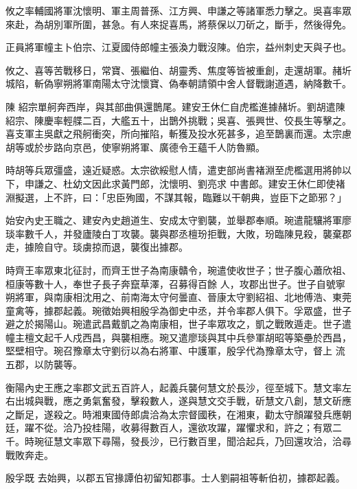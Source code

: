 \begin{pinyinscope}
 攸之率輔國將軍沈懷明、軍主周普孫、江方興、申謙之等諸軍悉力擊之。吳喜率眾來赴，為胡別軍所圍，甚急。有人來捉喜馬，將蔡保以刀斫之，斷手，然後得免。



 正員將軍幢主卜伯宗、江夏國侍郎幢主張渙力戰沒陳。伯宗，益州刺史天與子也。



 攸之、喜等苦戰移日，常寶、張繼伯、胡靈秀、焦度等皆被重創，走還胡軍。赭圻城陷，斬偽寧朔將軍南陽太守沈懷寶、偽奉朝請領中舍人督戰謝道遇，納降數千。



 陳
 紹宗單舸奔西岸，與其部曲俱還鵲尾。建安王休仁自虎檻進據赭圻。劉胡遣陳紹宗、陳慶率輕艓二百，大艦五十，出鵲外挑戰；吳喜、張興世、佼長生等擊之。喜支軍主吳獻之飛舸衝突，所向摧陷，斬獲及投水死甚多，追至鵲裏而還。太宗慮胡等或於步路向京邑，使寧朔將軍、廣德令王蘊千人防魯顯。



 時胡等兵眾彊盛，遠近疑惑。太宗欲綏慰人情，遣吏部尚書褚淵至虎檻選用將帥以下，申謙之、杜幼文因此求黃門郎，沈懷明、劉亮求
 中書郎。建安王休仁即使褚淵擬選，上不許，曰：「忠臣殉國，不謀其報，臨難以干朝典，豈臣下之節邪？」



 始安內史王職之、建安內史趙道生、安成太守劉襲，並舉郡奉順。琬遣龍驤將軍廖琰率數千人，并發廬陵白丁攻襲。襲與郡丞檀玢拒戰，大敗，玢臨陳見殺，襲棄郡走，據險自守。琰虜掠而退，襲復出據郡。



 時齊王率眾東北征討，而齊王世子為南康贛令，琬遣使收世子；世子腹心蕭欣祖、桓康等數十人，奉世子長子奔竄草澤，召募得百餘
 人，攻郡出世子。世子自號寧朔將軍，與南康相沈用之、前南海太守何曇直、晉康太守劉紹祖、北地傅浩、東莞童禽等，據郡起義。琬徵始興相殷孚為御史中丞，并令率郡人俱下。孚眾盛，世子避之於揭陽山。琬遣武昌戴凱之為南康相，世子率眾攻之，凱之戰敗遁走。世子遣幢主檀文起千人戍西昌，與襲相應。琬又遣廖琰與其中兵參軍胡昭等築壘於西昌，堅壁相守。琬召豫章太守劉衍以為右將軍、中護軍，殷孚代為豫章太守，督上
 流五郡，以防襲等。



 衡陽內史王應之率郡文武五百許人，起義兵襲何慧文於長沙，徑至城下。慧文率左右出城與戰，應之勇氣奮發，擊殺數人，遂與慧文交手戰，斫慧文八創，慧文斫應之斷足，遂殺之。時湘東國侍郎虞洽為太宗督國秩，在湘東，勸太守顏躍發兵應朝廷，躍不從。洽乃投桂陽，收募得數百人，還欲攻躍，躍懼求和，許之；有眾二千。時琬征慧文率眾下尋陽，發長沙，已行數百里，聞洽起兵，乃回還攻洽，洽尋戰敗奔走。



 殷孚既
 去始興，以郡五官掾譚伯初留知郡事。士人劉嗣祖等斬伯初，據郡起義。




\end{pinyinscope}
